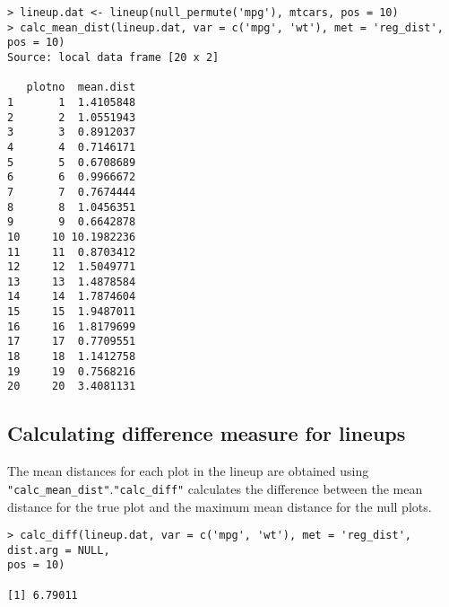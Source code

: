 \begin{verbatim}
> lineup.dat <- lineup(null_permute('mpg'), mtcars, pos = 10)
> calc_mean_dist(lineup.dat, var = c('mpg', 'wt'), met = 'reg_dist', pos = 10)
Source: local data frame [20 x 2]

   plotno  mean.dist
1       1  1.4105848
2       2  1.0551943
3       3  0.8912037
4       4  0.7146171
5       5  0.6708689
6       6  0.9966672
7       7  0.7674444
8       8  1.0456351
9       9  0.6642878
10     10 10.1982236
11     11  0.8703412
12     12  1.5049771
13     13  1.4878584
14     14  1.7874604
15     15  1.9487011
16     16  1.8179699
17     17  0.7709551
18     18  1.1412758
19     19  0.7568216
20     20  3.4081131
\end{verbatim}

\subsection{Calculating difference measure for
lineups}\label{calculating-difference-measure-for-lineups}

The mean distances for each plot in the lineup are obtained using
\texttt{"calc\_mean\_dist"}.\texttt{"calc\_diff"} calculates the
difference between the mean distance for the true plot and the maximum
mean distance for the null plots.

%

\begin{verbatim}
> calc_diff(lineup.dat, var = c('mpg', 'wt'), met = 'reg_dist', dist.arg = NULL, 
pos = 10)

[1] 6.79011
\end{verbatim}


